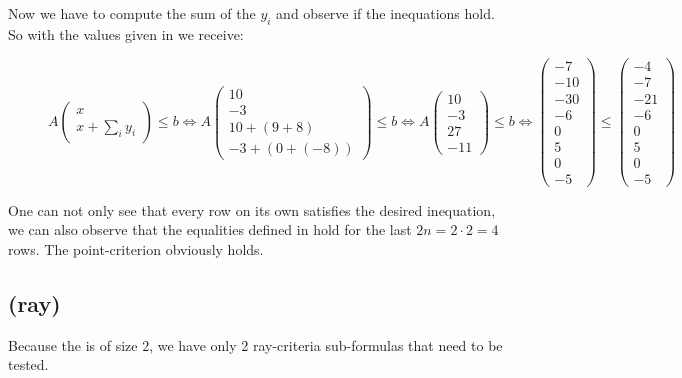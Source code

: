 	Now we have to compute the sum of the $y_i$ and observe if the inequations hold. So with the values given in  we receive:
	\begin{figure}[H]
		\centering
		$A\begin{pmatrix} x \\ x + \sum_i y_i \end{pmatrix} \le b \Leftrightarrow A\begin{pmatrix} 10 \\ -3 \\ 10 + (9+8) \\ -3 + (0+(-8))\end{pmatrix} \le b \Leftrightarrow A\begin{pmatrix} 10 \\ -3 \\ 27 \\ -11 \end{pmatrix} \le b \Leftrightarrow \begin{pmatrix} -7 \\ -10 \\ -30 \\ -6 \\ 0 \\ 5 \\ 0 \\ -5 \end{pmatrix} \le \begin{pmatrix}	-4 \\ -7 \\ -21 \\ -6 \\ 0 \\ 5 \\ 0 \\ -5 \end{pmatrix}$ 
	\end{figure}
	One can not only see that every row on its own satisfies the desired inequation, we can also observe that the equalities defined in  hold for the last $2n=2\cdot 2=4$ rows. The point-criterion obviously holds.

	\newsavebox{\raycrit}%
	\subsection[Verifying: ray-criterion]{(ray) \usebox{\raycrit}}
	Because the \gna is of size $2$, we have only 2 ray-criteria sub-formulas that need to be tested.
